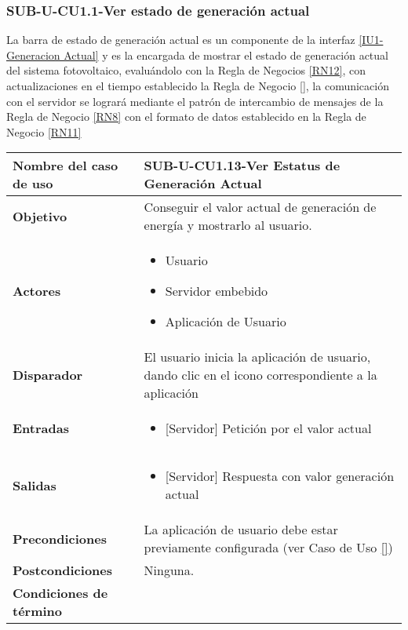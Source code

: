 \subsubsection{SUB-U-CU1.1-Ver estado de generación actual}\label{SUB-U-CU1.1}
La barra de estado de generación actual es un componente de la interfaz \hyperref[fig:monitoreo]{[IU1-Generacion Actual]}
y es la encargada de mostrar el estado de generación actual del sistema fotovoltaico, evaluándolo con la Regla de Negocios \ref{RN12}, con actualizaciones en el tiempo establecido la Regla de Negocio \ref{}, la comunicación con el servidor se logrará mediante el patrón de intercambio de mensajes de la Regla de Negocio \ref{RN8} con el formato de datos establecido en la Regla de Negocio \ref{RN11}   

\begin{longtable}{|J{5cm}|J{10.3cm}|}
	\hline
	\textbf{Nombre del caso de uso} &
		SUB-U-CU1.13-Ver Estatus de Generación Actual \\ \hline
	\textbf{Objetivo} &
		Conseguir el valor actual de generación de energía y mostrarlo al usuario. \\ \hline
	\textbf{Actores} &
		\begin{itemize}
		    \item Usuario
			\item Servidor embebido
			\item Aplicación de Usuario
		\end{itemize} \\ \hline
	\textbf{Disparador} & 
	    El usuario inicia la aplicación de usuario, dando clic en el icono correspondiente a la aplicación\\ \hline 
	\textbf{Entradas} & 
		\begin{itemize}
				\item{[Servidor]} Petición por el valor actual
		\end{itemize}\\ \hline 
	\textbf{Salidas} & 
		\begin{itemize}
			\item{[Servidor]} Respuesta con valor generación actual
		\end{itemize} \\ \hline
	\textbf{Precondiciones} &
		La aplicación de usuario debe estar previamente configurada (ver Caso de Uso \ref{}) \\ \hline
	\textbf{Postcondiciones} &
		Ninguna.\\ \hline
	\textbf{Condiciones de término} & 
		\begin{itemize}

\end{itemize}
\end{longtable}
